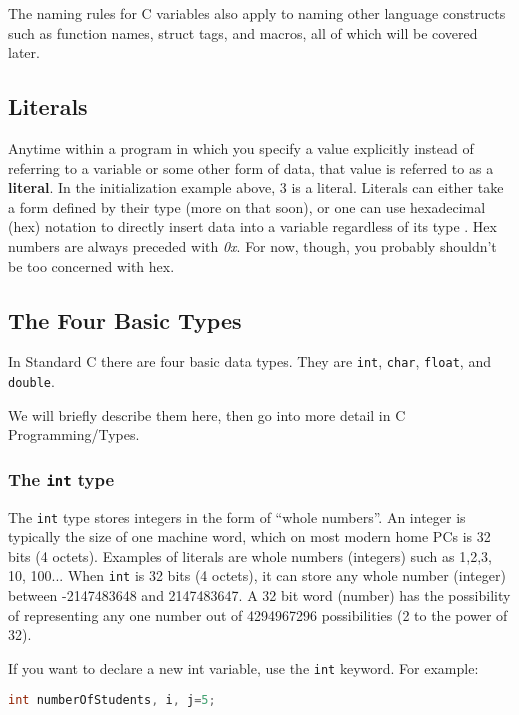 The naming rules for C variables also apply to naming other language constructs
such as function names, struct tags, and macros, all of which will be covered
later.

\subsection{Literals}
Anytime within a program in which you specify a value explicitly instead of
referring to a variable or some other form of data, that value is referred to
as a \textbf{literal}. In the initialization example above, 3 is a literal.
Literals can either take a form defined by their type (more on that soon), or
one can use hexadecimal (hex) notation to directly insert data into a variable
regardless of its type
. Hex numbers are always preceded with \emph{0x}. For now, though, you probably
shouldn't be too concerned with hex.

\subsection{The Four Basic Types}
In Standard C there are four basic data types. They are \texttt{int},
\texttt{char}, \texttt{float}, and \texttt{double}.

We will briefly describe them here, then go into more detail in C
Programming/Types.

\subsubsection{The \texttt{int} type}
The \texttt{int} type stores integers in the form of ``whole numbers''. An
integer is typically the size of one machine word, which on most modern home
PCs is 32 bits (4 octets). Examples of literals are whole numbers (integers)
such as 1,2,3, 10, 100... When \texttt{int} is 32 bits (4 octets), it can store
any whole number (integer) between -2147483648 and 2147483647. A 32 bit word
(number) has the possibility of representing any one number out of 4294967296
possibilities (2 to the power of 32).

If you want to declare a new int variable, use the \texttt{int} keyword. For
example:

\lstset{basicstyle=\scriptsize, numbers=left, captionpos=b, tabsize=4}
\begin{lstlisting}[caption=Section \thesection listing \arabic{varcnt},language={C},
breaklines=true,xleftmargin=15pt,label=lst:section\thesection listing\arabic{varcnt}]
int numberOfStudents, i, j=5;
\end{lstlisting}

